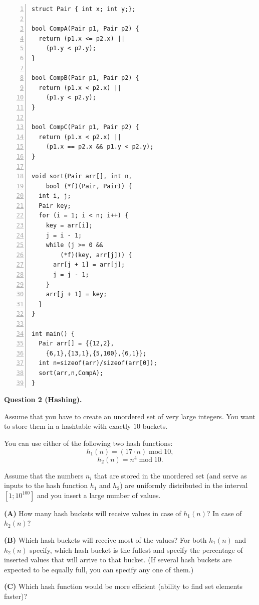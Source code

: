 \documentclass[a4paper,12pt]{article}
\begin{document}
\newpage


\begin{Verbatim}[frame=single,numbers=left]
struct Pair { int x; int y;}; 

bool CompA(Pair p1, Pair p2) {
  return (p1.x <= p2.x) || 
    (p1.y < p2.y);
}

bool CompB(Pair p1, Pair p2) {
  return (p1.x < p2.x) || 
    (p1.y < p2.y);
}

bool CompC(Pair p1, Pair p2) {
  return (p1.x < p2.x) || 
    (p1.x == p2.x && p1.y < p2.y);
}

void sort(Pair arr[], int n, 
    bool (*f)(Pair, Pair)) {  
  int i, j; 
  Pair key;
  for (i = 1; i < n; i++) {  
    key = arr[i];  
    j = i - 1;    
    while (j >= 0 && 
        (*f)(key, arr[j])) {
      arr[j + 1] = arr[j];  
      j = j - 1;  
    }  
    arr[j + 1] = key;  
  }
}  

int main() {  
  Pair arr[] = {{12,2},
    {6,1},{13,1},{5,100},{6,1}};
  int n=sizeof(arr)/sizeof(arr[0]);  
  sort(arr,n,CompA);
}  
\end{Verbatim}


\newpage

\vspace{20pt}
{\bf Question 2 (Hashing).} 

Assume that you have to create an unordered set of very large integers. 
You want to store them in a hashtable with exactly $10$ buckets. 

You can use either of the following two hash functions: 
$$h_1(n) = (17 \cdot n)\;\text{mod}\;10,$$
$$h_2(n) = n^4\;\text{mod}\;10.$$

Assume that the numbers $n_i$ that are stored in the unordered set
(and serve as inputs to the hash function $h_1$ and $h_2$) 
are uniformly distributed in the interval $[1;10^{100}]$
and you insert a large number of values.  

\vspace{5pt}
{\bf (A)} How many hash buckets will receive values in case 
of $h_1(n)$? In case of $h_2(n)$? 

\vspace{5pt}
{\bf (B)} Which hash buckets will receive most of the values?
For both $h_1(n)$ and $h_2(n)$ specify, which hash bucket is the
fullest and specify the percentage of inserted values that will 
arrive to that bucket. (If several hash buckets are expected to be equally 
full, you can specify any one of them.)

\vspace{5pt}
{\bf (C)} Which hash function would be more efficient (ability to 
find set elements faster)?
\end{document}
